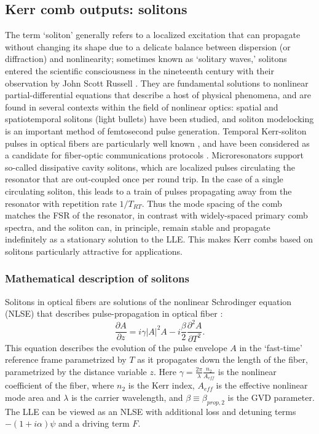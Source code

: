 \subsection{Kerr comb outputs: solitons} \label{sec:LLEsolitons}
The term `soliton' generally refers to a localized excitation that can propagate without changing its shape due to a delicate balance between dispersion (or diffraction) and nonlinearity; sometimes known as `solitary waves,' solitons entered the scientific consciousness in the nineteenth century with their observation by John Scott Russell \cite{Russell1844}. They are fundamental solutions to nonlinear partial-differential equations that describe a host of physical phenomena, and are found in several contexts within the field of nonlinear optics: spatial\cite{Lugiato1987,Brambilla1997} and spatiotemporal solitons (light bullets) \cite{Minardi2010} have been studied, and soliton modelocking \cite{Kartner1996,Grelu2012} is an important method of femtosecond pulse generation. Temporal Kerr-soliton pulses in optical fibers are particularly well known \cite{Agrawal2007,Mollenauer2006}, and have been considered as a candidate for fiber-optic communications protocols \cite{Hasegawa1995,Haus1996}. Microresonators support so-called dissipative cavity solitons, which are localized pulses circulating the resonator that are out-coupled once per round trip. In the case of a single circulating soliton, this leads to a train of pulses propagating away from the resonator with repetition rate $1/T_{RT}$. Thus the mode spacing of the comb matches the FSR of the resonator, in contrast with widely-spaced primary comb spectra, and the soliton can, in principle, remain stable and propagate indefinitely as a stationary solution to the LLE. This makes Kerr combs based on solitons particularly attractive for applications.

\subsubsection{Mathematical description of solitons}

Solitons in optical fibers are solutions of the nonlinear Schrodinger equation (NLSE) that describes pulse-propagation in optical fiber \cite{Agrawal2007}:
\begin{equation}
\frac{\partial A}{\partial z}= i\gamma|A|^2 A -i \frac{\beta}{2} \frac{\partial^2 A}{\partial T^2}. \label{NLSE}
\end{equation}
This equation describes the evolution of the pulse envelope $A$ in the `fast-time' reference frame parametrized by $T$ as it propagates down the length of the fiber, parametrized by the distance variable $z$. Here $\gamma=\frac{2\pi}{\lambda}\frac{n_2}{A_{eff}}$ is the nonlinear coefficient of the fiber, where $n_2$ is the Kerr index, $A_{eff}$ is the effective nonlinear mode area and $\lambda$ is the carrier wavelength, and $\beta\equiv\beta_{prop,2}$ is the GVD parameter. The LLE can be viewed as an NLSE with additional loss and detuning terms $-(1+i\alpha)\psi$ and a driving term $F$.

